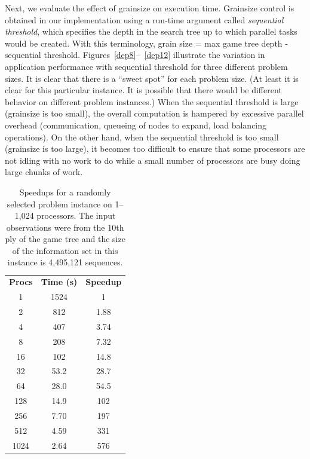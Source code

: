 \documentclass[10pt, conference, compsocconf]{IEEEtran}
\begin{document}
Next, we evaluate the effect of grainsize on execution time. 
Grainsize control is obtained in our implementation using a run-time argument called \emph{sequential threshold}, which specifies the depth in the search tree up to which parallel tasks would be created. With this terminology, grain size = max game tree depth - sequential threshold. Figures~\ref{dep8}--~\ref{dep12} illustrate the variation in application performance with sequential threshold for three different problem sizes.  It is clear that there is a ``sweet
spot'' for each problem size.  (At least it is clear for this particular
instance.  It is possible that there would be different behavior on different
problem instances.)  When the sequential threshold is large (grainsize is too small), the overall computation
is hampered by excessive parallel overhead (communication, queueing of nodes to
expand, load balancing operations).  On the other hand, when the sequential threshold is too small (grainsize is
too large), it becomes too difficult to ensure that some processors are not
idling with no work to do while a small number of processors are busy doing
large chunks of work.  


\begin{table}[t]

\caption{Speedups for a randomly selected problem instance on 1--1,024
processors.  The input observations were from the 10th ply of the game tree and
the size of the information set in this instance is 4,495,121 sequences.}
\centering
\begin{tabular}{ccc}
{\bf Procs}	&	{\bf Time (s)} 	&	{\bf Speedup}\\
1	&	1524	&	1\\
2	&	812	&	1.88\\
4	&	407	&	3.74\\
8	&	208	&	7.32\\
16	&	102	&	14.8\\
32	&	53.2	&	28.7\\
64	&	28.0	&	54.5\\
128	&	14.9	&	102\\
256	&	7.70	&	197\\
512	&	4.59	&	331\\
1024	&	2.64	&	576\\
\end{tabular}


\label{speedups}
\end{table}
\end{document}
